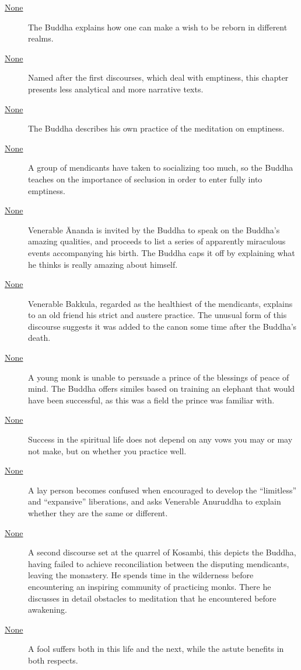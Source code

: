 \documentclass[12pt,openany]{book}%
\begin{document}
\begin{description}
\item[\href{\#mn120}{None}] The Buddha explains how one can make a wish to be reborn in different realms.%
\item[\href{\#mn{-}sunnatavagga}{None}] Named after the first discourses, which deal with emptiness, this chapter presents less analytical and more narrative texts.%
\item[\href{\#mn121}{None}] The Buddha describes his own practice of the meditation on emptiness.%
\item[\href{\#mn122}{None}] A group of mendicants have taken to socializing too much, so the Buddha teaches on the importance of seclusion in order to enter fully into emptiness.%
\item[\href{\#mn123}{None}] Venerable Ānanda is invited by the Buddha to speak on the Buddha’s amazing qualities, and proceeds to list a series of apparently miraculous events accompanying his birth. The Buddha caps it off by explaining what he thinks is really amazing about himself.%
\item[\href{\#mn124}{None}] Venerable Bakkula, regarded as the healthiest of the mendicants, explains to an old friend his strict and austere practice. The unusual form of this discourse suggests it was added to the canon some time after the Buddha’s death.%
\item[\href{\#mn125}{None}] A young monk is unable to persuade a prince of the blessings of peace of mind. The Buddha offers similes based on training an elephant that would have been successful, as this was a field the prince was familiar with.%
\item[\href{\#mn126}{None}] Success in the spiritual life does not depend on any vows you may or may not make, but on whether you practice well.%
\item[\href{\#mn127}{None}] A lay person becomes confused when encouraged to develop the “limitless” and “expansive” liberations, and asks Venerable Anuruddha to explain whether they are the same or different.%
\item[\href{\#mn128}{None}] A second discourse set at the quarrel of Kosambi, this depicts the Buddha, having failed to achieve reconciliation between the disputing mendicants, leaving the monastery. He spends time in the wilderness before encountering an inspiring community of practicing monks. There he discusses in detail obstacles to meditation that he encountered before awakening.%
\item[\href{\#mn129}{None}] A fool suffers both in this life and the next, while the astute benefits in both respects.%

\end{description}
\end{document}
